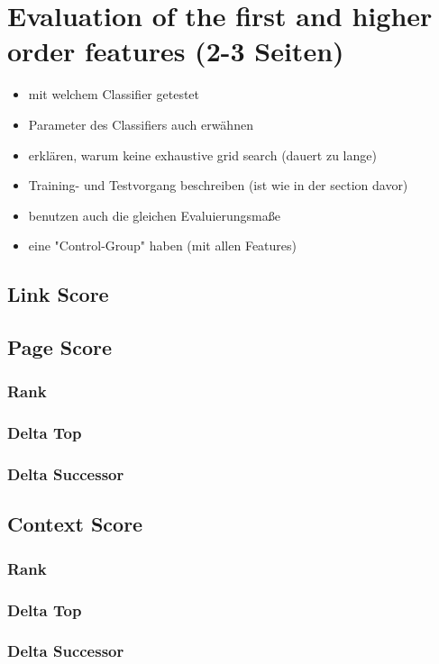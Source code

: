 \section{Evaluation of the first and higher order features (2-3 Seiten)}
\begin{itemize}
	\item mit welchem Classifier getestet
	\item Parameter des Classifiers auch erwähnen
	\item erklären, warum keine exhaustive grid search (dauert zu lange)
	\item Training- und Testvorgang beschreiben (ist wie in der section davor)
	\item benutzen auch die gleichen Evaluierungsmaße
	\item eine "Control-Group" haben (mit allen Features)
\end{itemize}

	\subsection{Link Score}
	\subsection{Page Score}
		\subsubsection{Rank}
		\subsubsection{Delta Top}
		\subsubsection{Delta Successor}
	\subsection{Context Score}
		\subsubsection{Rank}
		\subsubsection{Delta Top}
		\subsubsection{Delta Successor}
